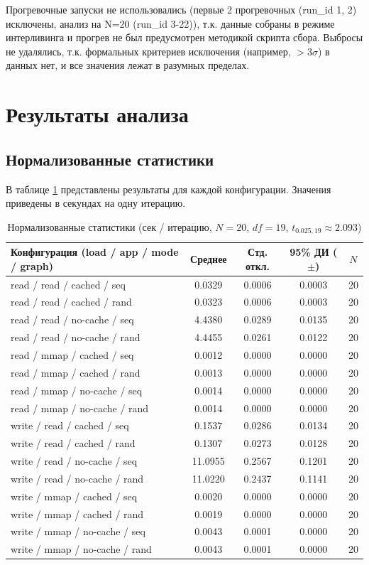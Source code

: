 \documentclass[12pt,a4paper]{article}
\begin{document}
Прогревочные запуски не использовались (первые 2 прогревочных (run_id 1, 2) исключены, анализ на N=20 (run_id 3-22)), т.к. данные собраны в режиме интерливинга и прогрев не был предусмотрен методикой скрипта сбора. Выбросы не удалялись, т.к. формальных критериев исключения (например, $>3\sigma$) в данных нет, и все значения лежат в разумных пределах.

\section{Результаты анализа}

\subsection{Нормализованные статистики}
В таблице \ref{tab:stats} представлены результаты для каждой конфигурации. Значения приведены в секундах на одну итерацию.

\begin{table}[h]
\centering
\small
\caption{Нормализованные статистики (сек / итерацию, $N=20$, $df=19$, $t_{0.025,19}\approx 2.093$)}
\label{tab:stats}
\begin{tabular}{lcccc}
\toprule
Конфигурация (load / app / mode / graph) & Среднее & Стд. откл. & 95\% ДИ ($\pm$) & $N$ \\
\midrule
read / read / cached / seq  & 0.0329 & 0.0006 & 0.0003 & 20 \\
read / read / cached / rand & 0.0323 & 0.0006 & 0.0003 & 20 \\
read / read / no-cache / seq & 4.4380 & 0.0289 & 0.0135 & 20 \\
read / read / no-cache / rand & 4.4455 & 0.0261 & 0.0122 & 20 \\
read / mmap / cached / seq  & 0.0012 & 0.0000 & 0.0000 & 20 \\
read / mmap / cached / rand & 0.0013 & 0.0000 & 0.0000 & 20 \\
read / mmap / no-cache / seq & 0.0014 & 0.0000 & 0.0000 & 20 \\
read / mmap / no-cache / rand & 0.0014 & 0.0000 & 0.0000 & 20 \\
write / read / cached / seq  & 0.1537 & 0.0286 & 0.0134 & 20 \\
write / read / cached / rand & 0.1307 & 0.0273 & 0.0128 & 20 \\
write / read / no-cache / seq & 11.0955 & 0.2567 & 0.1201 & 20 \\
write / read / no-cache / rand & 11.0220 & 0.2437 & 0.1141 & 20 \\
write / mmap / cached / seq  & 0.0020 & 0.0000 & 0.0000 & 20 \\
write / mmap / cached / rand & 0.0019 & 0.0000 & 0.0000 & 20 \\
write / mmap / no-cache / seq & 0.0043 & 0.0001 & 0.0000 & 20 \\
write / mmap / no-cache / rand & 0.0043 & 0.0001 & 0.0000 & 20 \\
\bottomrule
\end{tabular}
\end{table}
\end{document}

